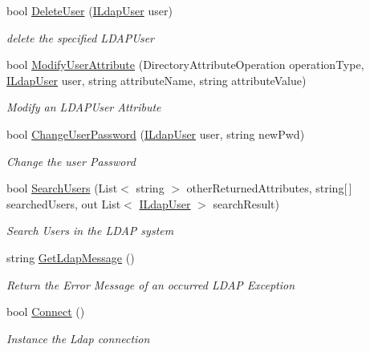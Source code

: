 \begin{DoxyCompactItemize}
bool \hyperlink{class_l_d_a_p_library_1_1_ldap_manager_a11f186145acab54321c1894259f7967c}{Delete\+User} (\hyperlink{interface_l_d_a_p_library_1_1_interfarces_1_1_i_ldap_user}{I\+Ldap\+User} user)
\begin{DoxyCompactList}\small\item\em delete the specified L\+D\+A\+P\+User \end{DoxyCompactList}\item 
bool \hyperlink{class_l_d_a_p_library_1_1_ldap_manager_ada0be0c06062c2eab739dcaeb19a5023}{Modify\+User\+Attribute} (Directory\+Attribute\+Operation operation\+Type, \hyperlink{interface_l_d_a_p_library_1_1_interfarces_1_1_i_ldap_user}{I\+Ldap\+User} user, string attribute\+Name, string attribute\+Value)
\begin{DoxyCompactList}\small\item\em Modify an L\+D\+A\+P\+User Attribute \end{DoxyCompactList}\item 
bool \hyperlink{class_l_d_a_p_library_1_1_ldap_manager_a88a4692054d4fe768dc5f08022f8b640}{Change\+User\+Password} (\hyperlink{interface_l_d_a_p_library_1_1_interfarces_1_1_i_ldap_user}{I\+Ldap\+User} user, string new\+Pwd)
\begin{DoxyCompactList}\small\item\em Change the user Password \end{DoxyCompactList}\item 
bool \hyperlink{class_l_d_a_p_library_1_1_ldap_manager_a9c6e78e2aa498d84a551d5d9f2321b8d}{Search\+Users} (List$<$ string $>$ other\+Returned\+Attributes, string\mbox{[}$\,$\mbox{]} searched\+Users, out List$<$ \hyperlink{interface_l_d_a_p_library_1_1_interfarces_1_1_i_ldap_user}{I\+Ldap\+User} $>$ search\+Result)
\begin{DoxyCompactList}\small\item\em Search Users in the L\+D\+A\+P system \end{DoxyCompactList}\item 
string \hyperlink{class_l_d_a_p_library_1_1_ldap_manager_ac2318217abb55a567726f743eb448095}{Get\+Ldap\+Message} ()
\begin{DoxyCompactList}\small\item\em Return the Error Message of an occurred L\+D\+A\+P Exception \end{DoxyCompactList}\item 
bool \hyperlink{class_l_d_a_p_library_1_1_ldap_manager_ae35b3da29e7cbf5b4b788fb3dfcb88c1}{Connect} ()
\begin{DoxyCompactList}\small\item\em Instance the Ldap connection \end{DoxyCompactList}\item 

\end{DoxyCompactItemize}
